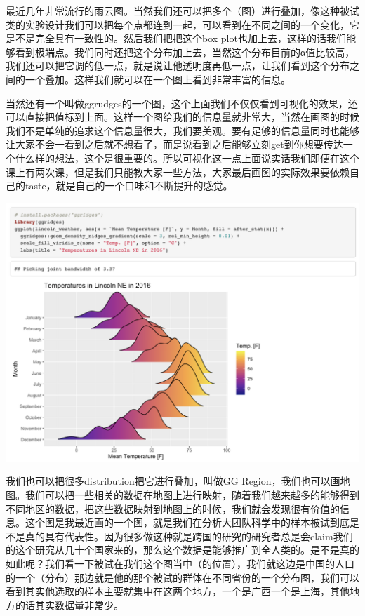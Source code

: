 \documentclass[
  oneside]{book}
\begin{document}
最近几年非常流行的雨云图。当然我们还可以把多个（图）进行叠加，像这种被试类的实验设计我们可以把每个点都连到一起，可以看到在不同之间的一个变化，它是不是完全具有一致性的。然后我们把把这个box plot也加上去，这样的话我们能够看到极端点。我们同时还把这个分布加上去，当然这个分布目前的α值比较高，我们还可以把它调的低一点，就是说让他透明度再低一点，让我们看到这个分布之间的一个叠加。这样我们就可以在一个图上看到非常丰富的信息。

当然还有一个叫做ggrudges的一个图，这个上面我们不仅仅看到可视化的效果，还可以直接把值标到上面。这样一个图给我们的信息量就非常大，当然在画图的时候我们不是单纯的追求这个信息量很大，我们要美观。要有足够的信息量同时也能够让大家不会一看到之后就不想看了，而是说看到之后能够立刻get到你想要传达一个什么样的想法，这个是很重要的。所以可视化这一点上面说实话我们即便在这个课上有两次课，但是我们只能教大家一些方法，大家最后画图的实际效果要依赖自己的taste，就是自己的一个口味和不断提升的感觉。

\includegraphics{1001-lesson1/image-20230302201322126.png}

我们也可以把很多distribution把它进行叠加，叫做GG Region，我们也可以画地图。我们可以把一些相关的数据在地图上进行映射，随着我们越来越多的能够得到不同地区的数据，把这些数据映射到地图上的时候，我们就会发现很有价值的信息。这个图是我最近画的一个图，就是我们在分析大团队科学中的样本被试到底是不是真的具有代表性。因为很多做这种就是跨国的研究的研究者总是会claim我们的这个研究从几十个国家来的，那么这个数据是能够推广到全人类的。是不是真的如此呢？我们看一下被试在我们这个图当中（的位置），我们就这边是中国的人口的一个（分布）那边就是他的那个被试的群体在不同省份的一个分布图，我们可以看到其实他选取的样本主要就集中在这两个地方，一个是广西一个是上海，其他地方的话其实数据量非常少。
\end{document}
